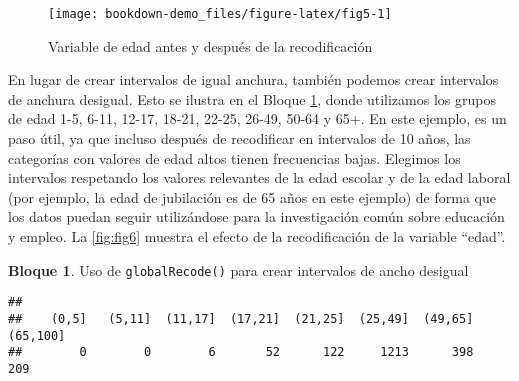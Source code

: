 \documentclass[
]{book}
\newenvironment{Shaded}{\begin{snugshade}}{\end{snugshade}}
\newcommand{\AttributeTok}[1]{\textcolor[rgb]{0.77,0.63,0.00}{#1}}
\newcommand{\CommentTok}[1]{\textcolor[rgb]{0.56,0.35,0.01}{\textit{#1}}}
\newcommand{\DecValTok}[1]{\textcolor[rgb]{0.00,0.00,0.81}{#1}}
\newcommand{\FunctionTok}[1]{\textcolor[rgb]{0.00,0.00,0.00}{#1}}
\newcommand{\NormalTok}[1]{#1}
\newcommand{\OtherTok}[1]{\textcolor[rgb]{0.56,0.35,0.01}{#1}}
\newcommand{\SpecialCharTok}[1]{\textcolor[rgb]{0.00,0.00,0.00}{#1}}
\newcommand{\StringTok}[1]{\textcolor[rgb]{0.31,0.60,0.02}{#1}}
\theoremstyle{definition}
\theoremstyle{definition}
\newtheorem{example}{Bloque}[chapter]
\theoremstyle{definition}
\theoremstyle{definition}
\theoremstyle{remark}
\begin{document}
\begin{figure}
\texttt{[image: bookdown-demo\_files/figure-latex/fig5-1]} \caption{Variable de edad antes y después de la recodificación}\label{fig:fig5}
\end{figure}

En lugar de crear intervalos de igual anchura, también podemos crear intervalos de anchura desigual. Esto se ilustra en el Bloque \ref{exm:bloque17jgm}, donde utilizamos los grupos de edad 1-5, 6-11, 12-17, 18-21, 22-25, 26-49, 50-64 y 65+. En este ejemplo, es un paso útil, ya que incluso después de recodificar en intervalos de 10 años, las categorías con valores de edad altos tienen frecuencias bajas. Elegimos los intervalos respetando los valores relevantes de la edad escolar y de la edad laboral (por ejemplo, la edad de jubilación es de 65 años en este ejemplo) de forma que los datos puedan seguir utilizándose para la investigación común sobre educación y empleo. La \ref{fig:fig6} muestra el efecto de la recodificación de la variable ``edad''.

\begin{example}
\protect\hypertarget{exm:bloque17jgm}{}\label{exm:bloque17jgm}Uso de \texttt{globalRecode()} para crear intervalos de ancho desigual
\end{example}

\begin{Shaded}
\end{Shaded}

\begin{verbatim}
## 
##    (0,5]   (5,11]  (11,17]  (17,21]  (21,25]  (25,49]  (49,65] (65,100] 
##        0        0        6       52      122     1213      398      209
\end{verbatim}
\end{document}
